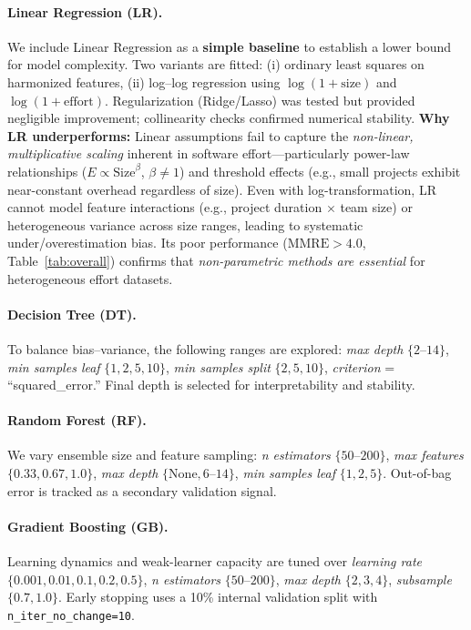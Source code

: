 \documentclass{ieeeaccess}
\begin{document}
\paragraph{Linear Regression (LR).}
We include Linear Regression as a \textbf{simple baseline} to establish a lower bound for model complexity.
Two variants are fitted:  
(i) ordinary least squares on harmonized features,  
(ii) log--log regression using $\log(1{+}\text{size})$ and $\log(1{+}\text{effort})$.  
Regularization (Ridge/Lasso) was tested but provided negligible improvement; collinearity checks confirmed numerical stability.
\textbf{Why LR underperforms:} Linear assumptions fail to capture the \textit{non-linear, multiplicative scaling} inherent in software effort---particularly power-law relationships ($E \propto \text{Size}^{\beta}$, $\beta \neq 1$) and threshold effects (e.g., small projects exhibit near-constant overhead regardless of size). Even with log-transformation, LR cannot model feature interactions (e.g., project duration $\times$ team size) or heterogeneous variance across size ranges, leading to systematic under/overestimation bias. Its poor performance ($\text{MMRE} > 4.0$, Table~\ref{tab:overall}) confirms that \textit{non-parametric methods are essential} for heterogeneous effort datasets.

\paragraph{Decision Tree (DT).}
To balance bias--variance, the following ranges are explored:  
\emph{max depth} $\{2$--$14\}$,  
\emph{min samples leaf} $\{1,2,5,10\}$,  
\emph{min samples split} $\{2,5,10\}$,  
\emph{criterion} = ``squared\_error.''  
Final depth is selected for interpretability and stability.

\paragraph{Random Forest (RF).}
We vary ensemble size and feature sampling:  
\emph{n estimators} $\{50$--$200\}$,  
\emph{max features} $\{0.33,0.67,1.0\}$,  
\emph{max depth} $\{\text{None},6$--$14\}$,  
\emph{min samples leaf} $\{1,2,5\}$.  
Out-of-bag error is tracked as a secondary validation signal.

\paragraph{Gradient Boosting (GB).}
Learning dynamics and weak-learner capacity are tuned over  
\emph{learning rate} $\{0.001,0.01,0.1,0.2,0.5\}$,  
\emph{n estimators} $\{50$--$200\}$,  
\emph{max depth} $\{2,3,4\}$,  
\emph{subsample} $\{0.7,1.0\}$.  
Early stopping uses a 10\% internal validation split with 
\texttt{n\_iter\_no\_change=10}.
\end{document}
